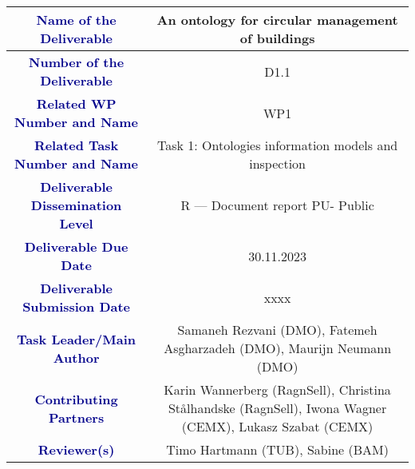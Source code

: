 \begin{table}[ht!]
\centering
\renewcommand{\arraystretch}{1.7} %
\begin{tabularx}{\textwidth}{|C|C|}
\hline
\textcolor{darkblue}{\textbf{Name of the Deliverable}} & An ontology for circular management of buildings \\ \hline
\textcolor{darkblue}{\textbf{Number of the Deliverable}} & D1.1 \\ \hline
\textcolor{darkblue}{\textbf{Related WP Number and Name}} & WP1 \\ \hline
\textcolor{darkblue}{\textbf{ Related Task Number and Name}} & Task 1: Ontologies information models and inspection \\ \hline
\textcolor{darkblue}{\textbf{Deliverable Dissemination Level}} & R — Document report PU- Public \\ \hline
\textcolor{darkblue}{\textbf{Deliverable Due Date}} & 30.11.2023 \\ \hline
\textcolor{darkblue}{\textbf{Deliverable Submission Date}} & xxxx \\ \hline
\textcolor{darkblue}{\textbf{Task Leader/Main Author}} & Samaneh Rezvani (DMO), Fatemeh Asgharzadeh (DMO), Maurijn Neumann (DMO) \\ \hline
\textcolor{darkblue}{\textbf{Contributing Partners}} & Karin Wannerberg (RagnSell), Christina Stålhandske (RagnSell), Iwona Wagner (CEMX), Lukasz Szabat (CEMX) \\ \hline
\textcolor{darkblue}{\textbf{Reviewer(s)}} & Timo Hartmann (TUB), Sabine (BAM) \\ \hline
\end{tabularx}
\end{table}
\newpage
